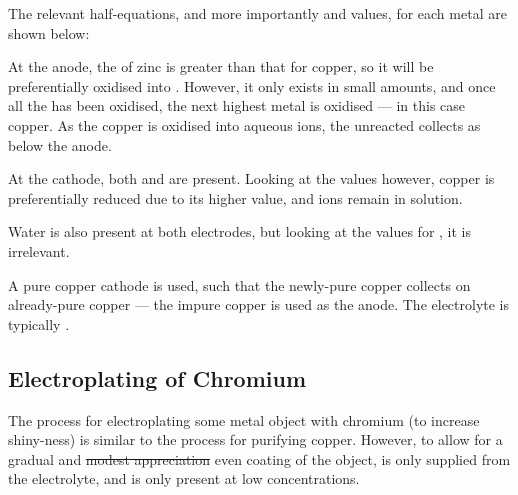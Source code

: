 
			The relevant half-equations, and more importantly \Eo{} and \Eox{} values, for each metal are shown below:




			At the anode, the \Eox{} of zinc is greater than that for copper, so it will be preferentially oxidised into . However,
			it only exists in small amounts, and once all the  has been oxidised, the next highest \Eox{} metal is oxidised --- in
			this case copper. As the copper is oxidised into aqueous ions, the unreacted  collects as 
			below the anode.

			At the cathode, both  and  are present. Looking at the \Eo{} values however, copper is preferentially reduced
			due to its higher \Eo{} value, and  ions remain in solution.

			Water is also present at both electrodes, but looking at the values for \Eo{}, it is irrelevant.

			A pure copper cathode is used, such that the newly-pure copper collects on already-pure copper --- the impure copper is used as
			the anode. The electrolyte is typically .



		\subsection{Electroplating of Chromium}

			The process for electroplating some metal object with chromium (to increase shiny-ness) is similar to the process for purifying
			copper. However, to allow for a gradual and \sout{modest appreciation} even coating of the object,  is only supplied
			from the electrolyte, and is only present at low concentrations.

